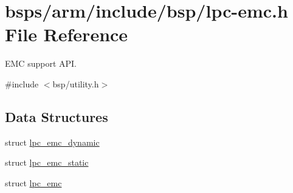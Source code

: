 \hypertarget{lpc-emc_8h}{}\section{bsps/arm/include/bsp/lpc-\/emc.h File Reference}
\label{lpc-emc_8h}


E\+MC support A\+PI.  


{\ttfamily \#include $<$bsp/utility.\+h$>$}\newline
\subsection*{Data Structures}
\begin{DoxyCompactItemize}
\item 
struct \mbox{\hyperlink{structlpc__emc__dynamic}{lpc\+\_\+emc\+\_\+dynamic}}
\item 
struct \mbox{\hyperlink{structlpc__emc__static}{lpc\+\_\+emc\+\_\+static}}
\item 
struct \mbox{\hyperlink{structlpc__emc}{lpc\+\_\+emc}}
\end{DoxyCompactItemize}
